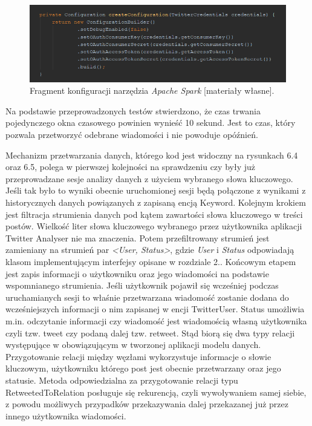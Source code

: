 \begin{figure}[h] %
	\centering
	\includegraphics[width=0.8\linewidth]{img/twitter_analyser_apache_spark_configuration}
	\caption{Fragment konfiguracji narzędzia \textit{Apache Spark} [materiały własne].}
\end{figure}

Na podstawie przeprowadzonych testów stwierdzono, że czas trwania pojedynczego okna czasowego powinien wynieść 10 sekund. Jest to czas, który pozwala przetworzyć odebrane wiadomości i nie powoduje opóźnień.

Mechanizm przetwarzania danych, którego kod jest widoczny na rysunkach 6.4 oraz 6.5, polega w pierwszej kolejności na sprawdzeniu czy były już przeprowadzane sesje analizy danych z użyciem wybranego słowa kluczowego. Jeśli tak było to wyniki obecnie uruchomionej sesji będą połączone z wynikami z historycznych danych powiązanych z zapisaną encją Keyword. Kolejnym krokiem jest filtracja strumienia danych pod kątem zawartości słowa kluczowego w treści postów. Wielkość liter słowa kluczowego wybranego przez użytkownika aplikacji Twitter Analyser nie ma znaczenia. Potem przefiltrowany strumień jest zamieniany na strumień par \textit{<User, Status>}, gdzie \textit{User} i \textit{Status} odpowiadają klasom implementującym interfejsy opisane w rozdziale 2.. Końcowym etapem jest zapis informacji o użytkowniku oraz jego wiadomości na podstawie wspomnianego strumienia. Jeśli użytkownik pojawił się wcześniej podczas uruchamianych sesji to właśnie przetwarzana wiadomość zostanie dodana do wcześniejszych informacji o nim zapisanej w encji TwitterUser. Status umożliwia m.in. odczytanie informacji czy wiadomość jest wiadomością własną użytkownika czyli tzw. tweet czy podaną dalej tzw. retweet. Stąd biorą się dwa typy relacji występujące w obowiązującym w tworzonej aplikacji modelu danych. Przygotowanie relacji między węzłami wykorzystuje informacje o słowie kluczowym, użytkowniku którego post jest obecnie przetwarzany oraz jego statusie. Metoda odpowiedzialna za przygotowanie relacji typu RetweetedToRelation posługuje się rekurencją, czyli wywoływaniem samej siebie, z powodu możliwych przypadków przekazywania dalej przekazanej już przez innego użytkownika wiadomości.

